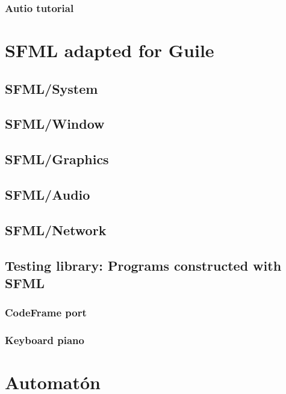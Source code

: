 \documentclass[latterpaper, leqno]{article}
\begin{document}
\subsubsection*{Autio tutorial}

\section{SFML adapted for Guile}
\subsection{SFML/System}
\subsection{SFML/Window}
\subsection{SFML/Graphics}
\subsection{SFML/Audio}
\subsection{SFML/Network}
\subsection{Testing library: Programs constructed with SFML}
\subsubsection*{CodeFrame port}
\subsubsection*{Keyboard piano}

\section{Automatón}
\end{document}

